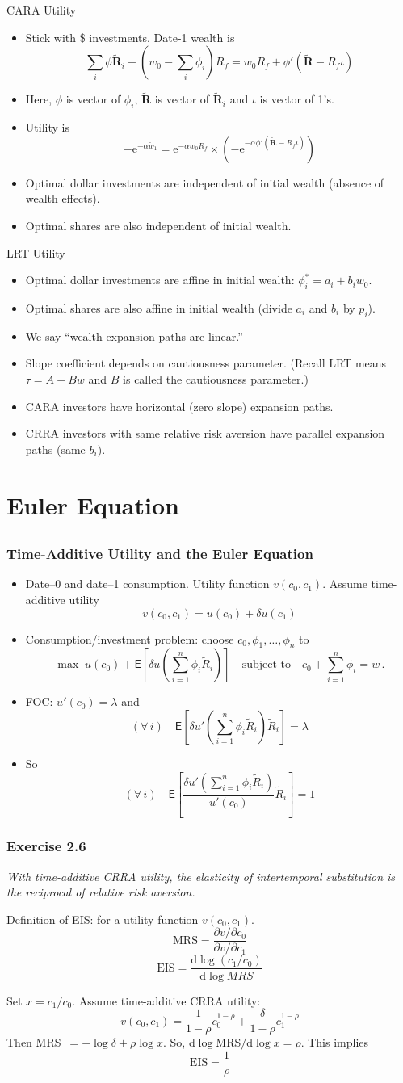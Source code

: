\documentclass[10pt]{beamer}
\newcommand{\bi}{\begin{itemize}}
\newcommand{\ei}{\end{itemize}}
\newcommand{\im}{\item}
\newcommand{\D}{\mathrm{d}}
\newcommand{\E}{\mathrm{e}}
\newcommand{\mye}{\ensuremath{\mathsf{E}}}
\newcommand{\bfr}{\begin{frame}}
\newcommand{\tw}{\tilde{w}}
\newcommand{\tr}{\widetilde{R}}
\newcommand{\tR}{\widetilde{\mathbf{R}}}
\newcommand{\lb}{\left[}
\newcommand{\lp}{\left(}
\newcommand{\rb}{\right]}
\newcommand{\rp}{\right)}
\begin{document}
\begin{frame}{CARA Utility} 
    \bi 
    \im Stick with \$ investments.  Date-1 wealth is
    $$\sum_i \phi \tR_i + \left(w_0- \sum_i \phi_i\right)R_f = w_0R_f + \phi'(\tR - R_f\iota)$$
    \im Here, $\phi$ is vector of $\phi_i$, $\tR$ is vector of $\tR_i$ and $\iota$ is vector of 1's.
    \im Utility is
    $$-\E^{-\alpha \tw_1} = \E^{-\alpha w_0R_f} \times \left(- \E^{-\alpha \phi'(\tR - R_f\iota)}\right)$$
    \im Optimal dollar investments are independent of initial wealth (absence of wealth effects).
    \im Optimal shares are also independent of initial wealth.
    \ei 
\end{frame}

\begin{frame}{LRT Utility}
    \bi 
    \im Optimal dollar investments are affine in initial wealth: $\phi_i^* = a_i + b_i w_0$.
    \im Optimal shares are also affine in initial wealth (divide $a_i$ and $b_i$ by $p_i$).
    \im We say ``wealth expansion paths are linear.''
    \im Slope coefficient depends on cautiousness parameter. (Recall LRT means $\tau = A + B w$ and $B$ is called the cautiousness parameter.)
    \im CARA investors have horizontal (zero slope) expansion paths.
    \im CRRA investors with same relative risk aversion have parallel expansion paths (same $b_i$).
    \ei
\end{frame}

\section{Euler Equation}
\subsection{}

\bfr\frametitle{Time-Additive Utility and the Euler Equation}
\bi
\im Date--0 and date--1 consumption.  Utility function $v(c_0,c_1)$.  Assume time-additive utility
$$v(c_0,c_1) = u(c_0) + \delta u(c_1)$$
\im Consumption/investment problem:  choose $c_0, \phi_1, \ldots, \phi_n$ to 
$$\max \;u(c_0) +  \mye\lb \delta u\lp \sum_{i=1}^n \phi_i\tr_i \rp \rb \quad \text{subject to} \quad c_0 + \sum_{i=1}^n \phi_i = w\,.$$
\im FOC: $u'(c_0) = \lambda$ and 
$$(\forall \,i) \quad  \mye\lb \delta u'\lp \sum_{i=1}^n \phi_i\tr_i \rp \tr_i\rb = \lambda$$
\im So
$$(\forall \,i) \quad \mye\lb \frac{\delta u'\lp \sum_{i=1}^n \phi_i\tr_i \rp}{u'(c_0)} \tr_i\rb = 1$$
\ei
\end{frame}



\bfr\frametitle{Exercise 2.6}
\textit{With time-additive CRRA utility, the elasticity of intertemporal substitution is the reciprocal of relative risk aversion.}

Definition of EIS: for a utility function $v(c_0,c_1)$.  
$$\text{MRS} = \frac{\partial v/\partial c_0}{\partial v/\partial c_1}$$
$$\text{EIS} = \frac{\D \log (c_1/c_0)}{\D \log MRS}$$

Set $x=c_1/c_0$.  Assume time-additive CRRA utility:
$$v(c_0,c_1) = \frac{1}{1-\rho}c_0^{1-\rho} + \frac{\delta}{1-\rho}c_1^{1-\rho}$$
Then MRS $\,= -\log \delta + \rho \log x$.  So, $\D \log \text{MRS} /\D \log x = \rho$.
 This implies $$\text{EIS}  = \frac{1}{\rho}$$
\end{frame}
\end{document}

